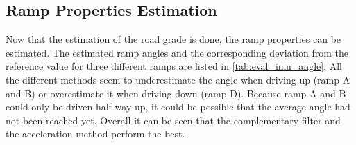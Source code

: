\subsection{Ramp Properties Estimation}
Now that the estimation of the road grade is done, the ramp properties can be estimated.
The estimated ramp angles and the corresponding deviation from the reference value for three different ramps are listed in \cref{tab:eval_imu_angle}.
All the different methods seem to underestimate the angle when driving up (ramp A and B) or overestimate it when driving down (ramp D).
Because ramp A and B could only be driven half-way up, it could be possible that the average angle had not been reached yet.
Overall it can be seen that the complementary filter and the acceleration method perform the best.\par
\begin{table}[htb]
    \centering
    \caption{Estimation of ramp angle.}
    \label{tab:eval_imu_angle}
\end{table}

